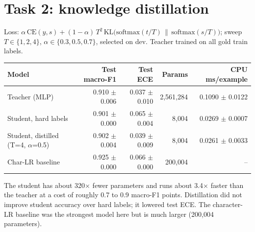 \documentclass[10pt]{article}
\begin{document}
\section{Task 2: knowledge distillation}
Loss: $\alpha\,\mathrm{CE}(y,s)+(1-\alpha)\,T^2\,\mathrm{KL}\big(\mathrm{softmax}(t/T)\,\|\,\mathrm{softmax}(s/T)\big)$; sweep $T\in\{1,2,4\}$, $\alpha\in\{0.3,0.5,0.7\}$, selected on dev. Teacher trained on all gold train labels.
\begin{center}\begin{tabular}{lrrrr}
\toprule
Model & Test macro-F1 & Test ECE & Params & CPU ms/example \\
\midrule
Teacher (MLP) & 0.910 $\pm$ 0.006 & 0.037 $\pm$ 0.010 & 2{,}561{,}284 & 0.1090 $\pm$ 0.0122 \\
Student{,} hard labels & 0.901 $\pm$ 0.000 & 0.065 $\pm$ 0.004 & 8{,}004 & 0.0269 $\pm$ 0.0007 \\
Student{,} distilled (T=4{,} $\alpha$=0.5) & 0.902 $\pm$ 0.004 & 0.039 $\pm$ 0.009 & 8{,}004 & 0.0261 $\pm$ 0.0033 \\
Char-LR baseline & 0.925 $\pm$ 0.000 & 0.066 $\pm$ 0.000 & 200{,}004 & -- \\
\bottomrule
\end{tabular}\end{center}
The student has about 320$\times$ fewer parameters and runs about 3.4$\times$ faster than the teacher at a cost of roughly 0.7 to 0.9 macro-F1 points. Distillation did not improve student accuracy over hard labels; it lowered test ECE. The character-LR baseline was the strongest model here but is much larger (200{,}004 parameters).
\end{document}
